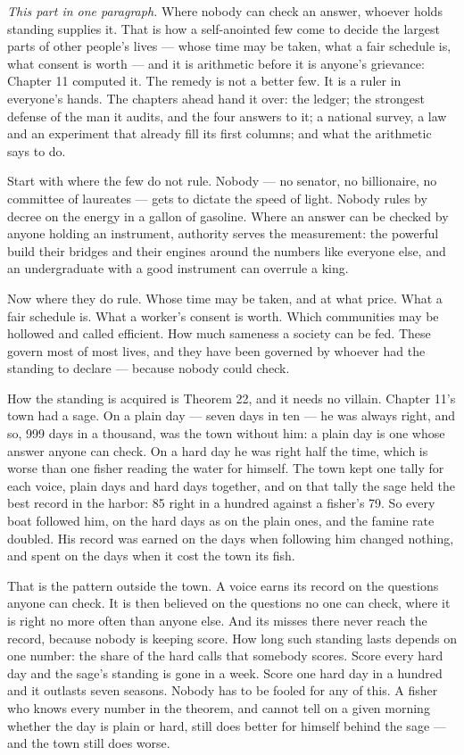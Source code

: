 
\emph{This part in one paragraph.} Where nobody can check an answer,
whoever holds standing supplies it. That is how a self-anointed few
come to decide the largest parts of other people's lives --- whose time
may be taken, what a fair schedule is, what consent is worth --- and it
is arithmetic before it is anyone's grievance: Chapter 11 computed it.
The remedy is not a better few. It is a ruler in everyone's hands. The
chapters ahead hand it over: the ledger; the strongest defense of the
man it audits, and the four answers to it; a national survey, a law
and an experiment that already fill its first columns; and what the
arithmetic says to do.

Start with where the few do not rule. Nobody --- no senator, no
billionaire, no committee of laureates --- gets to dictate the speed of
light. Nobody rules by decree on the energy in a gallon of gasoline.
Where an answer can be checked by anyone holding an instrument,
authority serves the measurement: the powerful build their bridges and
their engines around the numbers like everyone else, and an
undergraduate with a good instrument can overrule a king.

Now where they do rule. Whose time may be taken, and at what price.
What a fair schedule is. What a worker's consent is worth. Which
communities may be hollowed and called efficient. How much sameness a
society can be fed. These govern most of most lives, and they have
been governed by whoever had the standing to declare --- because nobody
could check.

How the standing is acquired is Theorem 22, and it needs no villain.
Chapter 11's town had a sage. On a plain day --- seven days in ten --- he
was always right, and so, 999 days in a thousand, was the town without
him: a plain day is one whose answer anyone can check. On a hard day
he was right half the time, which is worse than one fisher reading the
water for himself.
The town kept one tally for each voice, plain days and hard days
together, and on that tally the sage held the best record in the
harbor: 85 right in a hundred against a fisher's 79. So every boat
followed him, on the hard days as on the plain ones, and the famine
rate doubled. His record was earned on the days when following him
changed nothing, and spent on the days when it cost the town its
fish.

That is the pattern outside the town. A voice earns its record on the
questions anyone can check. It is then believed on the questions no
one can check, where it is right no more often than anyone else. And
its misses there never reach the record, because nobody is keeping
score. How long such standing lasts depends on one number: the share
of the hard calls that somebody scores. Score every hard day and the
sage's standing is gone in a week. Score one hard day in a hundred and
it outlasts seven seasons. Nobody has to be fooled for any of this. A
fisher who knows every number in the theorem, and cannot tell on a
given morning whether the day is plain or hard, still does better for
himself behind the sage --- and the town still does worse.

